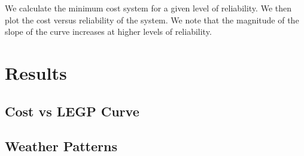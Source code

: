 \documentclass{article}
\begin{document}
We calculate the minimum cost system for a given level of reliability.
We then plot the cost versus reliability of the system.
We note that the magnitude of the slope of the curve increases at higher
levels of reliability.


\section{Results}
\subsection{Cost vs LEGP Curve}
\subsection{Weather Patterns}
\end{document}
